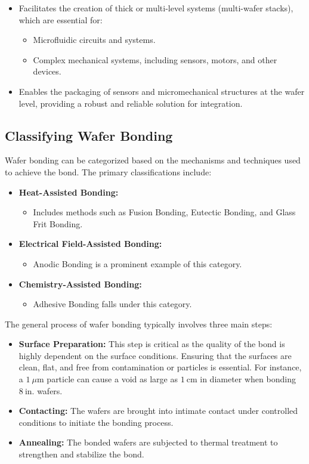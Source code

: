 \documentclass{report}
\begin{document}
\begin{itemize}
    \item Facilitates the creation of thick or multi-level systems (multi-wafer stacks), which are essential for:
    \begin{itemize}
        \item Microfluidic circuits and systems.
        \item Complex mechanical systems, including sensors, motors, and other devices.
    \end{itemize}
    \item Enables the packaging of sensors and micromechanical structures at the wafer level, providing a robust and reliable solution for integration.
\end{itemize}

\subsection{Classifying Wafer Bonding}
Wafer bonding can be categorized based on the mechanisms and techniques used to achieve the bond. The primary classifications include:
\begin{itemize}
    \item \textbf{Heat-Assisted Bonding:}
    \begin{itemize}
        \item Includes methods such as Fusion Bonding, Eutectic Bonding, and Glass Frit Bonding.
    \end{itemize}
    \item \textbf{Electrical Field-Assisted Bonding:}
    \begin{itemize}
        \item Anodic Bonding is a prominent example of this category.
    \end{itemize}
    \item \textbf{Chemistry-Assisted Bonding:}
    \begin{itemize}
        \item Adhesive Bonding falls under this category.
    \end{itemize}
\end{itemize}
The general process of wafer bonding typically involves three main steps:
\begin{itemize}
    \item \textbf{Surface Preparation:} This step is critical as the quality of the bond is highly dependent on the surface conditions. Ensuring that the surfaces are clean, flat, and free from contamination or particles is essential. For instance, a $1~\mu\text{m}$ particle can cause a void as large as $1~\text{cm}$ in diameter when bonding $8~\text{in.}$ wafers.
    \item \textbf{Contacting:} The wafers are brought into intimate contact under controlled conditions to initiate the bonding process.
    \item \textbf{Annealing:} The bonded wafers are subjected to thermal treatment to strengthen and stabilize the bond.
\end{itemize}
\end{document}
